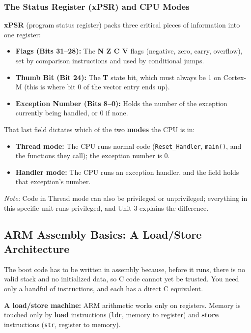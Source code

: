 \subsubsection{The Status Register (xPSR) and CPU Modes}
\textbf{xPSR} (program status register) packs three critical pieces of information into one register:
\begin{itemize}
    \item \textbf{Flags (Bits 31--28):} The \textbf{N Z C V} flags (negative, zero, carry, overflow), set by comparison instructions and used by conditional jumps.
    \item \textbf{Thumb Bit (Bit 24):} The \textbf{T} state bit, which must always be 1 on Cortex-M (this is where bit 0 of the vector entry ends up).
    \item \textbf{Exception Number (Bits 8--0):} Holds the number of the exception currently being handled, or 0 if none.
\end{itemize}

That last field dictates which of the two \textbf{modes} the CPU is in:
\begin{itemize}
    \item \textbf{Thread mode:} The CPU runs normal code (\texttt{Reset\_Handler}, \texttt{main()}, and the functions they call); the exception number is 0.
    \item \textbf{Handler mode:} The CPU runs an exception handler, and the field holds that exception's number.
\end{itemize}
\textit{Note:} Code in Thread mode can also be privileged or unprivileged; everything in this specific unit runs privileged, and Unit 3 explains the difference.

\subsection{ARM Assembly Basics: A Load/Store Architecture}
The boot code has to be written in assembly because, before it runs, there is no valid stack and no initialized data, so C code cannot yet be trusted. You need only a handful of instructions, and each has a direct C equivalent.

\textbf{A load/store machine:} ARM arithmetic works only on registers. Memory is touched only by \textbf{load} instructions (\texttt{ldr}, memory to register) and \textbf{store} instructions (\texttt{str}, register to memory).

